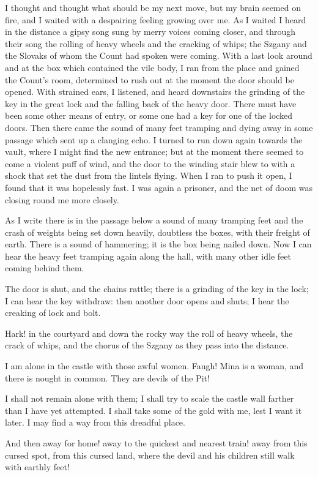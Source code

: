 \documentclass[12pt,openright]{book}
\begin{document}
I thought and thought what should be my next move, but my brain seemed on fire, and I waited with a despairing feeling growing over me. As I waited I heard in the distance a gipsy song sung by merry voices coming closer, and through their song the rolling of heavy wheels and the cracking of whips; the Szgany and the Slovaks of whom the Count had spoken were coming. With a last look around and at the box which contained the vile body, I ran from the place and gained the Count’s room, determined to rush out at the moment the door should be opened. With strained ears, I listened, and heard downstairs the grinding of the key in the great lock and the falling back of the heavy door. There must have been some other means of entry, or some one had a key for one of the locked doors. Then there came the sound of many feet tramping and dying away in some passage which sent up a clanging echo. I turned to run down again towards the vault, where I might find the new entrance; but at the moment there seemed to come a violent puff of wind, and the door to the winding stair blew to with a shock that set the dust from the lintels flying. When I ran to push it open, I found that it was hopelessly fast. I was again a prisoner, and the net of doom was closing round me more closely.

As I write there is in the passage below a sound of many tramping feet and the crash of weights being set down heavily, doubtless the boxes, with their freight of earth. There is a sound of hammering; it is the box being nailed down. Now I can hear the heavy feet tramping again along the hall, with many other idle feet coming behind them.

The door is shut, and the chains rattle; there is a grinding of the key in the lock; I can hear the key withdraw: then another door opens and shuts; I hear the creaking of lock and bolt.

Hark! in the courtyard and down the rocky way the roll of heavy wheels, the crack of whips, and the chorus of the Szgany as they pass into the distance.

I am alone in the castle with those awful women. Faugh! Mina is a woman, and there is nought in common. They are devils of the Pit!

I shall not remain alone with them; I shall try to scale the castle wall farther than I have yet attempted. I shall take some of the gold with me, lest I want it later. I may find a way from this dreadful place.

And then away for home! away to the quickest and nearest train! away from this cursed spot, from this cursed land, where the devil and his children still walk with earthly feet!
\end{document}
